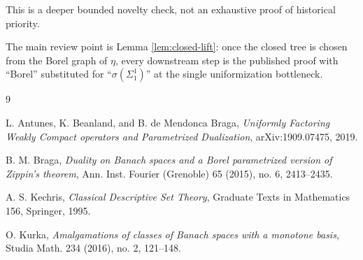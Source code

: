 \documentclass[11pt]{article}
\begin{document}
This is a deeper bounded novelty check, not an exhaustive proof of historical
priority.

The main review point is Lemma \ref{lem:closed-lift}: once the closed tree is
chosen from the Borel graph of $\eta$, every downstream step is the published
proof with ``Borel'' substituted for ``$\sigma(\Sigma^1_1)$'' at the single
uniformization bottleneck.

\begin{thebibliography}{9}

L. Antunes, K. Beanland, and B. de Mendonca Braga,
\emph{Uniformly Factoring Weakly Compact operators and Parametrized Dualization},
arXiv:1909.07475, 2019.

B. M. Braga,
\emph{Duality on Banach spaces and a Borel parametrized version of Zippin's theorem},
Ann. Inst. Fourier (Grenoble) 65 (2015), no. 6, 2413--2435.

A. S. Kechris,
\emph{Classical Descriptive Set Theory},
Graduate Texts in Mathematics 156, Springer, 1995.

O. Kurka,
\emph{Amalgamations of classes of Banach spaces with a monotone basis},
Studia Math. 234 (2016), no. 2, 121--148.

\end{thebibliography}
\end{document}
